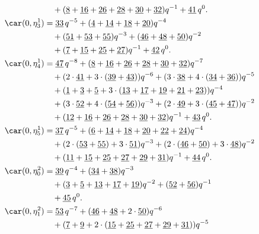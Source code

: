 \begin{align*}
	&\quad+(\underline{8}+\underline{16}+\underline{26}+\underline{28}+\underline{30}+\underline{32})q^{-1}+\underline{41}\,q^0.\\
	\car(0,\eta^{1}_{3})
	&=\underline{33}\,q^{-5}+(\underline{4}+\underline{14}+\underline{18}+\underline{20})q^{-4}\\
	&\quad+(\underline{51}+\underline{53}+\underline{55})q^{-3}+(\underline{46}+\underline{48}+\underline{50})q^{-2}\\
	&\quad+(\underline{7}+\underline{15}+\underline{25}+\underline{27})q^{-1}+\underline{42}\,q^0.\\
	\car(0,\eta^{1}_{4})
	&=\underline{47}\,q^{-8}+(\underline{8}+\underline{16}+\underline{26}+\underline{28}+\underline{30}+\underline{32})q^{-7}\\
	&\quad+(2\cdot\underline{41}+3\cdot(\underline{39}+\underline{43}))q^{-6}+(3\cdot\underline{38}+4\cdot(\underline{34}+\underline{36}))q^{-5}\\
	&\quad+(\underline{1}+\underline{3}+\underline{5}+3\cdot(\underline{13}+\underline{17}+\underline{19}+\underline{21}+\underline{23}))q^{-4}\\
	&\quad+(3\cdot\underline{52}+4\cdot(\underline{54}+\underline{56}))q^{-3}+(2\cdot\underline{49}+3\cdot(\underline{45}+\underline{47}))q^{-2}\\
	&\quad+(\underline{12}+\underline{16}+\underline{26}+\underline{28}+\underline{30}+\underline{32})q^{-1}+\underline{43}\,q^0.\\
	\car(0,\eta^{1}_{5})
	&=\underline{37}\,q^{-5}+(\underline{6}+\underline{14}+\underline{18}+\underline{20}+\underline{22}+\underline{24})q^{-4}\\
	&\quad+(2\cdot(\underline{53}+\underline{55})+3\cdot\underline{51})q^{-3}+(2\cdot(\underline{46}+\underline{50})+3\cdot\underline{48})q^{-2}\\
	&\quad+(\underline{11}+\underline{15}+\underline{25}+\underline{27}+\underline{29}+\underline{31})q^{-1}+\underline{44}\,q^0.\\
	\car(0,\eta^{2}_{0})
	&=\underline{39}\,q^{-4}+(\underline{34}+\underline{38})q^{-3}\\
	&\quad+(\underline{3}+\underline{5}+\underline{13}+\underline{17}+\underline{19})q^{-2}+(\underline{52}+\underline{56})q^{-1}\\
	&\quad+\underline{45}\,q^0.\\
	\car(0,\eta^{2}_{1})
	&=\underline{53}\,q^{-7}+(\underline{46}+\underline{48}+2\cdot\underline{50})q^{-6}\\
	&\quad+(\underline{7}+\underline{9}+2\cdot(\underline{15}+\underline{25}+\underline{27}+\underline{29}+\underline{31}))q^{-5}\\

\end{align*}
